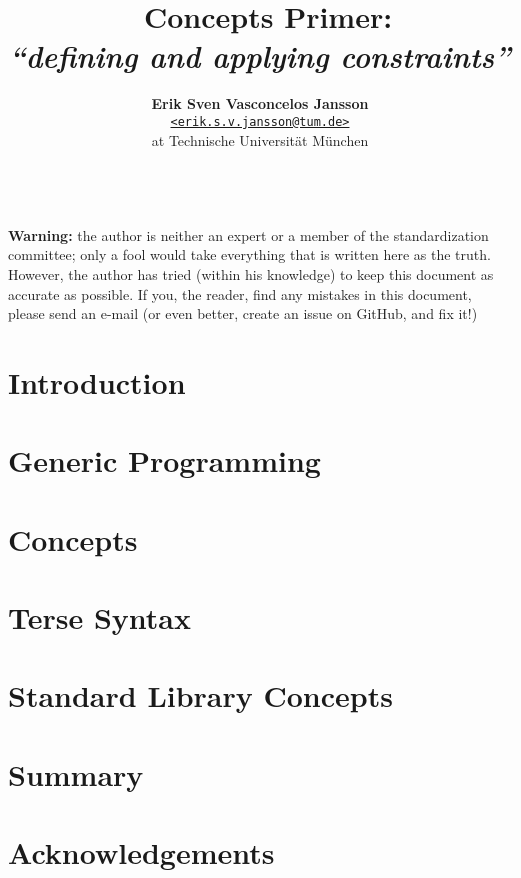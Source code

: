 \documentclass[a4paper, 11pt]{article}
\title{\vspace{-1.5em}\textbf{\Cpp\ Concepts Primer:}\\
       \large{\emph{``defining and applying constraints''}}}
\author{{\textbf{Erik Sven Vasconcelos Jansson}} \\
        {\href{mailto:erik.s.v.jansson@tum.de}
        {\texttt{<erik.s.v.jansson@tum.de>}}} \\
        {at Technische Universität München}}
\begin{document}
    \maketitle \begin{spacing}{0.94} \tableofcontents \end{spacing}

    \mbox{} \\ \noindent \textbf{Warning:} the author is neither an expert or a member of the standardization committee; only a fool would take everything that is written here as the truth. However, the author has tried (within his knowledge) to keep this document as accurate as possible. If you, the reader, find any mistakes in this document, please send an e-mail (or even better, create an issue on GitHub, and fix it!) \mbox{}  \thispagestyle{empty} \newpage {}

    \section{Introduction} \label{sec:introduction} 

    \newpage

    \section{Generic Programming} \label{sec:generic_programming} 

    \newpage

    \section{Concepts} \label{sec:concepts} 

    \newpage

    \section{Terse Syntax} \label{sec:terse_syntax} 

    \newpage

    \section{Standard Library Concepts} \label{sec:standard_library_concepts} 

    \newpage

    \section{Summary} \label{sec:summary} 

    \newpage
    \nocite{*} %
    
    
    \newpage

    \section*{Acknowledgements} \label{sec:acknowledgements} 
\end{document}
